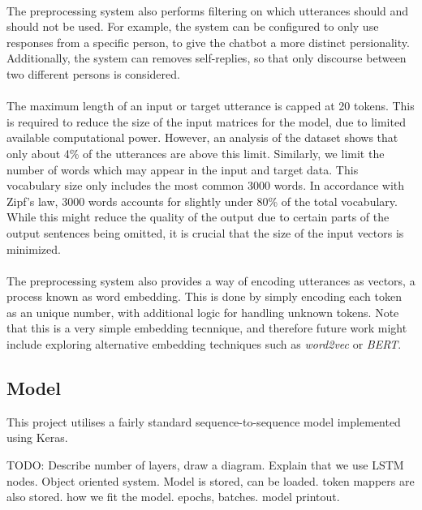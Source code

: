 \documentclass{article}
\begin{document}
\paragraph{}
The preprocessing system also performs filtering on which utterances should
and should not be used. For example, the system can be configured to only
use responses from a specific person, to give the chatbot a more distinct
persionality. Additionally, the system can removes self-replies, so that
only discourse between two different persons is considered.

\paragraph{}
The maximum length of an input or target utterance is capped at 20 tokens.
This is required to reduce the size of the input matrices for the model, due
to limited available computational power. However, an analysis of the dataset
shows that only about 4\% of the utterances are above this limit. Similarly,
we limit the number of words which may appear in the input and target data.
This vocabulary size only includes the most common 3000 words. In accordance
with Zipf's law, 3000 words accounts for slightly under 80\% of the total
vocabulary. While this might reduce the quality of the output due to certain
parts of the output sentences being omitted, it is crucial that the size of
the input vectors is minimized.

\paragraph{}
The preprocessing system also provides a way of encoding utterances as
vectors, a process known as word embedding. This is done by simply
encoding each token as an unique number, with additional logic for handling
unknown tokens. Note that this is a very simple embedding tecnnique, and
therefore future work might include exploring alternative embedding techniques
such as \emph{word2vec} or \emph{BERT}.

\subsection{Model}

This project utilises a fairly standard sequence-to-sequence model implemented
using Keras.

TODO: Describe number of layers, draw a diagram. Explain that we use LSTM nodes.
Object oriented system. Model is stored, can be loaded. token mappers are also
stored. how we fit the model. epochs, batches. model printout.
\end{document}
